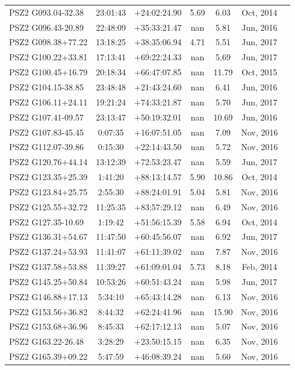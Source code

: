 \documentclass[apj, revtex4]{emulateapj}
\begin{document}
\begin{longtable*}{lcccccc}
PSZ2 G093.04-32.38 & 23:01:43 & +24:02:24.90 & 5.69 & 6.03 & Oct, 2014\\
PSZ2 G096.43-20.89 & 22:48:09 & +35:33:21.47 & nan & 5.81 & Jun, 2016\\
PSZ2 G098.38+77.22 & 13:18:25 & +38:35:06.94 & 4.71 & 5.51 & Jun, 2017\\
PSZ2 G100.22+33.81 & 17:13:41 & +69:22:24.33 & nan & 5.69 & Jun, 2017\\
PSZ2 G100.45+16.79 & 20:18:34 & +66:47:07.85 & nan & 11.79 & Oct, 2015\\
PSZ2 G104.15-38.85 & 23:48:48 & +21:43:24.60 & nan & 6.41 & Jun, 2016\\
PSZ2 G106.11+24.11 & 19:21:24 & +74:33:21.87 & nan & 5.70 & Jun, 2017\\
PSZ2 G107.41-09.57 & 23:13:47 & +50:19:32.01 & nan & 10.69 & Jun, 2016\\
PSZ2 G107.83-45.45 & 0:07:35 & +16:07:51.05 & nan & 7.09 & Nov, 2016\\
PSZ2 G112.07-39.86 & 0:15:30 & +22:14:43.50 & nan & 5.72 & Nov, 2016\\
PSZ2 G120.76+44.14 & 13:12:39 & +72:53:23.47 & nan & 5.59 & Jun, 2017\\
PSZ2 G123.35+25.39 & 1:41:20 & +88:13:14.57 & 5.90 & 10.86 & Oct, 2014\\
PSZ2 G123.84+25.75 & 2:55:30 & +88:24:01.91 & 5.04 & 5.81 & Nov, 2016\\
PSZ2 G125.55+32.72 & 11:25:35 & +83:57:29.12 & nan & 6.49 & Nov, 2016\\
PSZ2 G127.35-10.69 & 1:19:42 & +51:56:15.39 & 5.58 & 6.94 & Oct, 2014\\
PSZ2 G136.31+54.67 & 11:47:50 & +60:45:56.07 & nan & 6.92 & Jun, 2017\\
PSZ2 G137.24+53.93 & 11:41:07 & +61:11:39.02 & nan & 7.87 & Nov, 2016\\
PSZ2 G137.58+53.88 & 11:39:27 & +61:09:01.04 & 5.73 & 8.18 & Feb, 2014\\
PSZ2 G145.25+50.84 & 10:53:26 & +60:51:43.24 & nan & 5.98 & Jun, 2017\\
PSZ2 G146.88+17.13 & 5:34:10 & +65:43:14.28 & nan & 6.13 & Nov, 2016\\
PSZ2 G153.56+36.82 & 8:44:32 & +62:24:41.96 & nan & 15.90 & Nov, 2016\\
PSZ2 G153.68+36.96 & 8:45:33 & +62:17:12.13 & nan & 5.07 & Nov, 2016\\
PSZ2 G163.22-26.48 & 3:28:29 & +23:50:15.15 & nan & 6.35 & Nov, 2016\\
PSZ2 G165.39+09.22 & 5:47:59 & +46:08:39.24 & nan & 5.60 & Nov, 2016\\

\end{longtable*}
\end{document}
